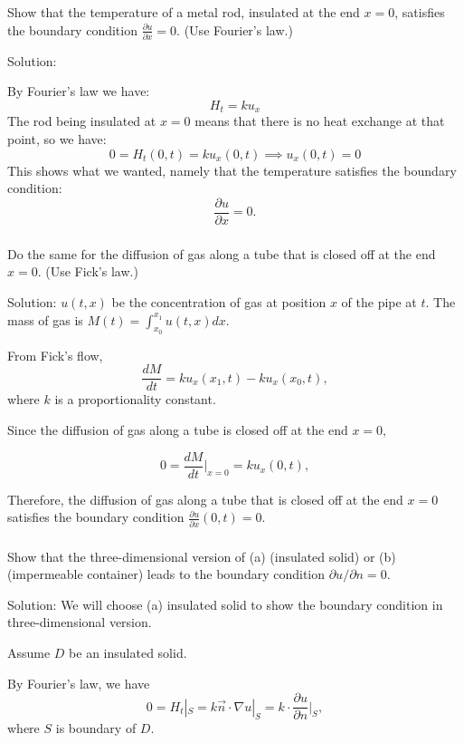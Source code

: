 \documentclass{article}
\begin{document}
		\subsubsection{}
		Show that the temperature of a metal rod,
			insulated at the end $x=0$, satisfies the boundary
			condition $\frac{\partial u}{\partial x} =0$. (Use
		Fourier's law.)

			Solution:

			By Fourier's law we have:
			\[
				H_t = ku_x
			\]
			The rod being insulated at $x=0$ means that there is no
			heat exchange at that point, so we have:
			\[
				0 = H_t(0,t) = ku_x(0,t) \implies u_x(0,t) =0
			\]
			This shows what we wanted, namely that the temperature
			satisfies the boundary condition:
			\[
				\frac{\partial u}{\partial x} =0.
			\]
		\subsubsection{}
		Do the same for the diffusion of gas along a tube that is closed off at the end $x=0$. (Use Fick's law.)
		
		Solution: $u(t,x)$ be the concentration of gas at position $x$ of the pipe at $t$.
        The mass of gas is $M(t)= \int_{x_0}^{x_1} u(t,x)dx$.
		
		From Fick's flow, 
        \[ \frac{dM}{dt}=ku_{x}(x_{1},t)- ku_{x}(x_{0},t),\]
		where $k$ is a proportionality constant.

		Since the diffusion of gas along a tube is closed off at the end $x=0$,

       \[0= \frac{dM}{dt}|_ {x=0}= ku_{x}(0,t),\]

	   Therefore, the diffusion of gas along a tube that is closed off at the end $x=0$ satisfies the boundary condition $ \frac{\partial u}{\partial x}(0,t)=0.$

	\subsubsection{}
Show that the three-dimensional version of (a) (insulated solid) or (b) (impermeable container) leads to the boundary condition $\partial u/ \partial n=0$.
		
		Solution: We will choose (a) insulated solid to show the boundary condition in three-dimensional version.
	    
		Assume $D$ be an insulated solid.
		 
		By Fourier's law, we have 
		 \[0= H_{t}|_{S}= k\vec{n}\cdot \nabla u |_{S}=k\cdot \frac{\partial u}{\partial n}|_{S}, \]
        where $S$ is boundary of $D$.
\end{document}
